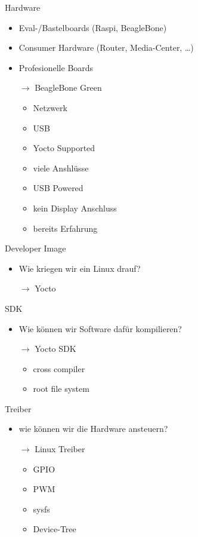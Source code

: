 \begin{frame}{Hardware}
	\begin{itemize}
		\item Eval-/Bastelboards (Raspi, BeagleBone)
		\item Consumer Hardware (Router, Media-Center, \ldots)
		\item Profesionelle Boards
		\item[$\rightarrow$] BeagleBone Green
		\begin{itemize}
			\item Netzwerk
			\item USB
			\item Yocto Supported
			\item viele Anshlüsse
			\item USB Powered
			\item kein Display Anschluss
			\item bereits Erfahrung
		\end{itemize}
	\end{itemize}
\end{frame}

\begin{frame}{Developer Image}
	\begin{itemize}
		\item Wie kriegen wir ein Linux drauf?
		\item[$\rightarrow$] Yocto
	\end{itemize}
\end{frame}

\begin{frame}{SDK}
	\begin{itemize}
		\item Wie können wir Software dafür kompilieren?
		\item[$\rightarrow$] Yocto SDK
		\begin{itemize}
			\item cross compiler
			\item root file system
		\end{itemize}
	\end{itemize}
\end{frame}

\begin{frame}{Treiber}
	\begin{itemize}
		\item wie können wir die Hardware ansteuern?
		\item[$\rightarrow$] Linux Treiber
		\begin{itemize}
			\item GPIO
			\item PWM
			\item sysfs
			\item Device-Tree
		\end{itemize}
	\end{itemize}
\end{frame}

